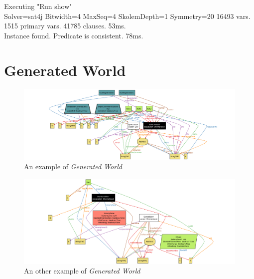    \vspace{1cm}

   Executing "Run show" \\ \noindent
      Solver=sat4j Bitwidth=4 MaxSeq=4 SkolemDepth=1 Symmetry=20
      16493 vars. 1515 primary vars. 41785 clauses. 53ms. \\ \noindent
      Instance found. Predicate is consistent. 78ms.


\clearpage

\section{Generated World}

   \begin{figure}[H]
   \begin{center}
     \includegraphics[width=\textwidth]{./img/alloy/alloy2.png}
     \hspace{0.05\linewidth}
     \centering
     \caption{An example of \textit{Generated World}}
     \label{img:generatedWorld}
   \end{center}
   \end{figure}

 \begin{figure}[H]
 \begin{center}
   \includegraphics[width=\textwidth]{./img/alloy/alloy3.png}
   \hspace{0.05\linewidth}
   \centering
   \caption{An other example of \textit{Generated World}}
   \label{img:generatedWorld2}
 \end{center}
 \end{figure}

